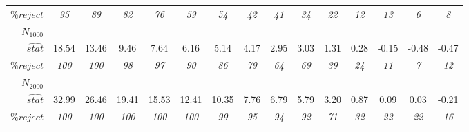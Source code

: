 {{\begin{tabular}{rrrrrrrrrrrrrrr}
$\% reject$ & \multicolumn{1}{c}{\textit{95}} & \multicolumn{1}{c}{\textit{89}} & \multicolumn{1}{c}{\textit{82}} & \multicolumn{1}{c}{\textit{76}} & \multicolumn{1}{c}{\textit{59}} & \multicolumn{1}{c}{\textit{54}} & \multicolumn{1}{c}{\textit{42}} & \multicolumn{1}{c}{\textit{41}} & \multicolumn{1}{c}{\textit{34}} & \multicolumn{1}{c}{\textit{22}} & \multicolumn{1}{c}{\textit{12}} & \multicolumn{1}{c}{\textit{13}} & \multicolumn{1}{c}{\textit{6}} & \multicolumn{1}{c}{\textit{8}} \\
\boldmath{}\textbf{$N_{1000}$}\unboldmath{} &       &       &       &       &       &       &       &       &       &       &       &       &       &  \\
$\hat {stat}$ & \multicolumn{1}{c}{18.54} & \multicolumn{1}{c}{13.46} & \multicolumn{1}{c}{9.46} & \multicolumn{1}{c}{7.64} & \multicolumn{1}{c}{6.16} & \multicolumn{1}{c}{5.14} & \multicolumn{1}{c}{4.17} & \multicolumn{1}{c}{2.95} & \multicolumn{1}{c}{3.03} & \multicolumn{1}{c}{1.31} & \multicolumn{1}{c}{0.28} & \multicolumn{1}{c}{-0.15} & \multicolumn{1}{c}{-0.48} & \multicolumn{1}{c}{-0.47} \\
$\% reject$ & \multicolumn{1}{c}{\textit{100}} & \multicolumn{1}{c}{\textit{100}} & \multicolumn{1}{c}{\textit{98}} & \multicolumn{1}{c}{\textit{97}} & \multicolumn{1}{c}{\textit{90}} & \multicolumn{1}{c}{\textit{86}} & \multicolumn{1}{c}{\textit{79}} & \multicolumn{1}{c}{\textit{64}} & \multicolumn{1}{c}{\textit{69}} & \multicolumn{1}{c}{\textit{39}} & \multicolumn{1}{c}{\textit{24}} & \multicolumn{1}{c}{\textit{11}} & \multicolumn{1}{c}{\textit{7}} & \multicolumn{1}{c}{\textit{12}} \\
\boldmath{}\textbf{$N_{2000}$}\unboldmath{} &       &       &       &       &       &       &       &       &       &       &       &       &       &  \\
$\hat {stat}$ & \multicolumn{1}{c}{32.99} & \multicolumn{1}{c}{26.46} & \multicolumn{1}{c}{19.41} & \multicolumn{1}{c}{15.53} & \multicolumn{1}{c}{12.41} & \multicolumn{1}{c}{10.35} & \multicolumn{1}{c}{7.76} & \multicolumn{1}{c}{6.79} & \multicolumn{1}{c}{5.79} & \multicolumn{1}{c}{3.20} & \multicolumn{1}{c}{0.87} & \multicolumn{1}{c}{0.09} & \multicolumn{1}{c}{0.03} & \multicolumn{1}{c}{-0.21} \\
$\% reject$ & \multicolumn{1}{c}{\textit{100}} & \multicolumn{1}{c}{\textit{100}} & \multicolumn{1}{c}{\textit{100}} & \multicolumn{1}{c}{\textit{100}} & \multicolumn{1}{c}{\textit{100}} & \multicolumn{1}{c}{\textit{99}} & \multicolumn{1}{c}{\textit{95}} & \multicolumn{1}{c}{\textit{94}} & \multicolumn{1}{c}{\textit{92}} & \multicolumn{1}{c}{\textit{71}} & \multicolumn{1}{c}{\textit{32}} & \multicolumn{1}{c}{\textit{22}} & \multicolumn{1}{c}{\textit{22}} & \multicolumn{1}{c}{\textit{16}} \\

\end{tabular}}}
